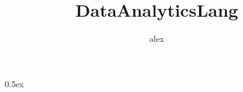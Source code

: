 \documentclass[11pt,a4paper]{article}
\begin{document}
\title{DataAnalyticsLang}
\author{alex}
\maketitle

\tableofcontents

\parindent 0pt\parskip 0.5ex



%
%
\end{document}
